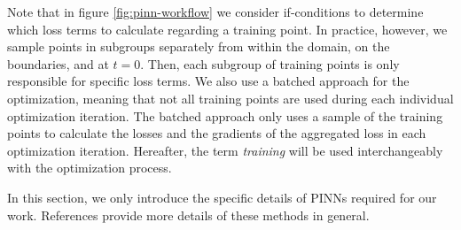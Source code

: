 Note that in figure \ref{fig:pinn-workflow} we consider if-conditions to determine which loss terms to calculate regarding a training point.
In practice, however, we sample points in subgroups separately from within the domain, on the boundaries, and at $t=0$.
Then, each subgroup of training points is only responsible for specific loss terms.
We also use a batched approach for the optimization,
meaning that not all training points are used during each individual optimization iteration.
The batched approach only uses a sample of the training points to calculate the losses and the gradients of the aggregated loss in each optimization iteration.
Hereafter, the term {\it training} will be used interchangeably with the optimization process.

In this section, we only introduce the specific details of PINNs required for our work.
References \cite{dissanayake_neural-network-based_1994,lagaris_artificial_1998,cai_physics-informed_2021} provide more details of these methods in general.

